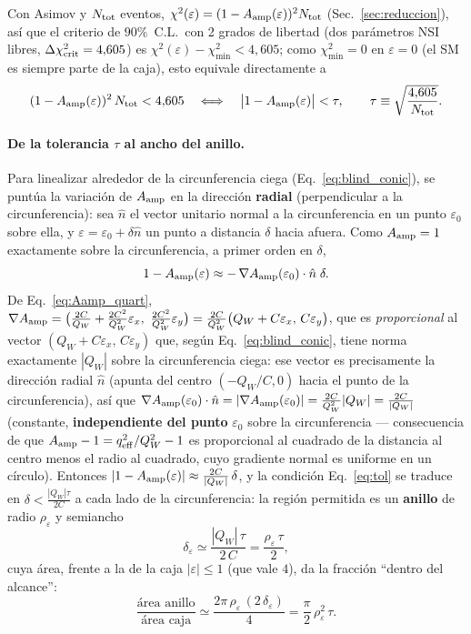 \documentclass[11pt,a4paper]{article}
\newcommand{\eps}{\varepsilon}
\newcommand{\QW}{Q_{W}}
\newcommand{\qeff}{q_{\rm eff}}
\newcommand{\Aamp}{A_{\rm amp}}
\begin{document}
Con Asimov y $N_{\rm tot}$ eventos, $\chi^{2}(\eps)=(1-\Aamp(\eps))^{2}N_{\rm
tot}$ (Sec.~\ref{sec:reduccion}), as\'i que el criterio de $90\%$~C.L.\ con 2
grados de libertad (dos par\'ametros NSI libres, $\Delta\chi^{2}_{\rm
crit}=4{,}605$) es $\chi^{2}(\eps)-\chi^{2}_{\min}<4{,}605$; como
$\chi^{2}_{\min}=0$ en $\eps=0$ (el SM es siempre parte de la caja), esto
equivale directamente a
\begin{equation}
  \label{eq:tol}
  (1-\Aamp(\eps))^{2}\,N_{\rm tot} < 4{,}605
  \quad\Longleftrightarrow\quad
  \bigl|1 - \Aamp(\eps)\bigr| < \tau,
  \qquad
  \tau \equiv \sqrt{\frac{4{,}605}{N_{\rm tot}}}.
\end{equation}
\paragraph{De la tolerancia $\tau$ al ancho del anillo.} Para linealizar
alrededor de la circunferencia ciega (Eq.~\eqref{eq:blind_conic}), se punt\'ua
la variaci\'on de $\Aamp$ en la direcci\'on \textbf{radial} (perpendicular a la
circunferencia): sea $\hat n$ el vector unitario normal a la circunferencia en
un punto $\eps_{0}$ sobre ella, y $\eps=\eps_{0}+\delta\hat n$ un punto a
distancia $\delta$ hacia afuera. Como $\Aamp=1$ exactamente sobre la
circunferencia, a primer orden en $\delta$,
\begin{equation}
  1-\Aamp(\eps) \approx -\,\nabla\Aamp(\eps_{0})\cdot\hat n\;\delta .
\end{equation}
De Eq.~\eqref{eq:Aamp_quart}, $\nabla\Aamp=\bigl(\tfrac{2C}{\QW}+\tfrac{2C^{2}}
{\QW^{2}}\eps_{x},\ \tfrac{2C^{2}}{\QW^{2}}\eps_{y}\bigr)
=\tfrac{2C}{\QW^{2}}\bigl(\QW+C\eps_{x},\,C\eps_{y}\bigr)$, que es
\emph{proporcional} al vector $(\QW+C\eps_x,\,C\eps_y)$ que, seg\'un
Eq.~\eqref{eq:blind_conic}, tiene norma exactamente $|\QW|$ sobre la
circunferencia ciega: ese vector es precisamente la direcci\'on radial
$\hat n$ (apunta del centro $(-\QW/C,0)$ hacia el punto de la circunferencia),
as\'i que $\nabla\Aamp(\eps_0)\cdot\hat n = |\nabla\Aamp(\eps_0)| =
\tfrac{2C}{\QW^{2}}|\QW| = \tfrac{2C}{|\QW|}$ (constante, \textbf{independiente
del punto} $\eps_0$ sobre la circunferencia --- consecuencia de que
$\Aamp-1=\qeff^2/\QW^2-1$ es proporcional al cuadrado de la distancia al centro
menos el radio al cuadrado, cuyo gradiente normal es uniforme en un c\'irculo).
Entonces $|1-\Aamp(\eps)|\approx\tfrac{2C}{|\QW|}\,\delta$, y la condici\'on
Eq.~\eqref{eq:tol} se traduce en $\delta<\tfrac{|\QW|\tau}{2C}$ a cada lado de la
circunferencia: la regi\'on permitida es un \textbf{anillo} de radio $\rho_{\eps}$
y semiancho
\begin{equation}
  \label{eq:halfwidth}
  \delta_{\eps} \simeq \frac{|\QW|\,\tau}{2\,C} = \frac{\rho_{\eps}\,\tau}{2},
\end{equation}
cuya \'area, frente a la de la caja $|\eps|\le 1$ (que vale $4$), da la fracci\'on
``dentro del alcance'':
\begin{equation}
  \label{eq:frac_area}
  \frac{\text{\'area anillo}}{\text{\'area caja}}
  \simeq \frac{2\pi\,\rho_{\eps}\,(2\,\delta_{\eps})}{4}
  = \frac{\pi}{2}\,\rho_{\eps}^{2}\,\tau .
\end{equation}
\end{document}
